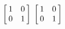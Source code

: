 {$\left[\hskip -3pt \begin{array}{cc} 1&0\\  0&1\end {array} \hskip -3pt
 \right] $
 }
{$\left[\hskip -3pt \begin{array}{cc} 1&0\\  0&1\end {array} \hskip -3pt
 \right] $}

